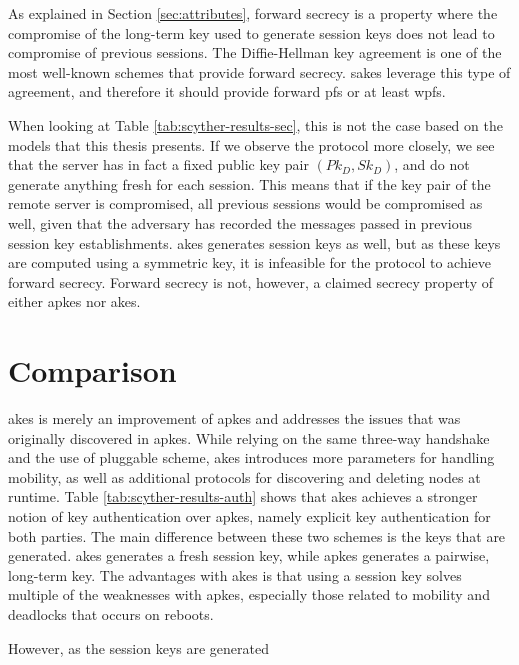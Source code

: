 As explained in Section \ref{sec:attributes}, forward secrecy is a property where the compromise of the long-term key used to generate session keys does not lead to compromise of previous sessions. The Diffie-Hellman key agreement is one of the most well-known schemes that provide forward secrecy. \gls{sakes} leverage this type of agreement, and therefore it should provide forward \gls{pfs} or at least \gls{wpfs}.

When looking at Table \ref{tab:scyther-results-sec}, this is not the case based on the models that this thesis presents. If we observe the protocol more closely, we see that the server has in fact a fixed public key pair $(Pk_D, Sk_D)$, and do not generate anything fresh for each session. This means that if the key pair of the remote server is compromised, all previous sessions would be compromised as well, given that the adversary has recorded the messages passed in previous session key establishments. \gls{akes} generates session keys as well, but as these keys are computed using a symmetric key, it is infeasible for the protocol to achieve forward secrecy. Forward secrecy is not, however, a claimed secrecy property of either \gls{apkes} nor {akes}.


\section{Comparison}



% 


\gls{akes} is merely an improvement of \gls{apkes} and addresses the issues that was originally discovered in \gls{apkes}. While relying on the same three-way handshake and the use of pluggable scheme, \gls{akes} introduces more parameters for handling mobility, as well as additional protocols for discovering and deleting nodes at runtime. Table \ref{tab:scyther-results-auth} shows that \gls{akes} achieves a stronger notion of key authentication over \gls{apkes}, namely explicit key authentication for both parties. The main difference between these two schemes is the keys that are generated. \gls{akes} generates a fresh session key, while \gls{apkes} generates a pairwise, long-term key. The advantages with \gls{akes} is that using a session key solves multiple of the weaknesses with \gls{apkes}, especially those related to mobility and deadlocks that occurs on reboots.

However, as the session keys are generated 


